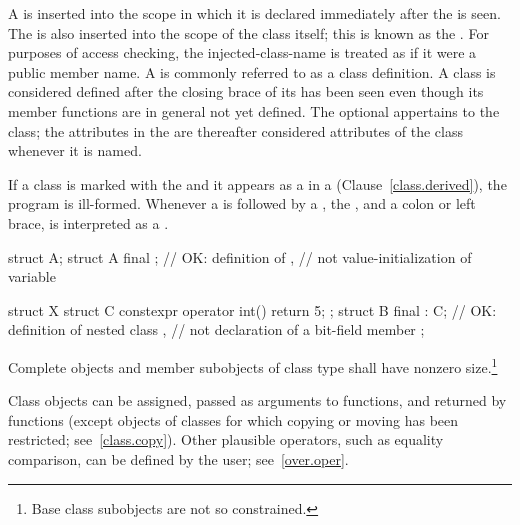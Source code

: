 \pnum
A  is inserted into the scope in which it is
declared immediately after the  is seen. The
 is also inserted into the scope of the class
itself; this is known as the .
%
For purposes of access checking, the injected-class-name is treated as
if it were a public member name.
%
A  is commonly referred to as a class
definition.
%
A class is considered defined after the closing brace of its
 has been seen even though its member
functions are in general not yet defined.
The optional  appertains to the class; the attributes in
the  are thereafter considered attributes of the class
whenever it is named.

\pnum
If a class is marked with the   and it appears
as a  in a 
(Clause~\ref{class.derived}), the program is ill-formed. Whenever a
 is followed by a , the
 , and a colon or left brace,  is
interpreted as a . \begin{example}
\begin{codeblock}
struct A;
struct A final {};      // OK: definition of ,
                        // not value-initialization of variable 

struct X {
 struct C { constexpr operator int() { return 5; } };
 struct B final : C{};  // OK: definition of nested class ,
                        // not declaration of a bit-field member 
};
\end{codeblock}
\end{example}

\pnum
Complete objects and member subobjects of class type shall have nonzero
size.\footnote{Base class subobjects are not so constrained.}
\begin{note}
Class objects can be assigned, passed as arguments to functions, and
returned by functions (except objects of classes for which copying or moving has
been restricted; see~\ref{class.copy}). Other plausible operators, such
as equality comparison, can be defined by the user; see~\ref{over.oper}.
\end{note}


